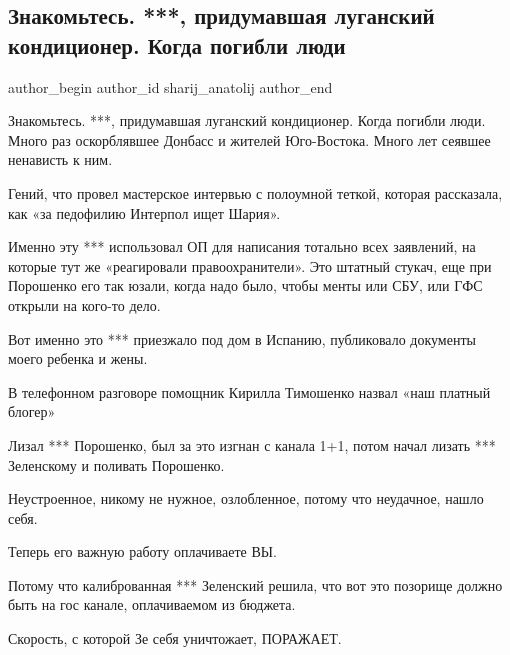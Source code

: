  
 
 
 
 
 
\subsection{Знакомьтесь. ***, придумавшая луганский кондиционер. Когда погибли люди}
\label{sec:15_12_2021.fb.sharij_anatolij.1.ivanov_sergej_rada_video}
 
\ifcmt
 author_begin
   author_id sharij_anatolij
 author_end
\fi

Знакомьтесь. ***, придумавшая луганский кондиционер. Когда погибли люди. Много
раз оскорблявшее Донбасс и жителей Юго-Востока. Много лет сеявшее ненависть к
ним. 

Гений, что провел мастерское интервью с полоумной теткой, которая рассказала,
как «за педофилию Интерпол ищет Шария». 

Именно эту *** использовал ОП для написания тотально всех заявлений, на которые
тут же «реагировали правоохранители». Это штатный стукач, еще при Порошенко его
так юзали, когда надо было, чтобы менты или СБУ, или ГФС открыли на кого-то
дело. 

Вот именно это *** приезжало под дом в Испанию, публиковало документы моего
ребенка и жены. 

В телефонном разговоре помощник Кирилла Тимошенко назвал «наш платный блогер»

Лизал *** Порошенко, был за это изгнан с канала 1+1, потом начал лизать ***
Зеленскому и поливать Порошенко. 

Неустроенное, никому не нужное, озлобленное, потому что неудачное, нашло себя.  

Теперь его важную работу оплачиваете ВЫ. 

Потому что калиброванная *** Зеленский решила, что вот это позорище должно быть
на гос канале, оплачиваемом из бюджета. 

Скорость, с которой Зе себя уничтожает, ПОРАЖАЕТ.
